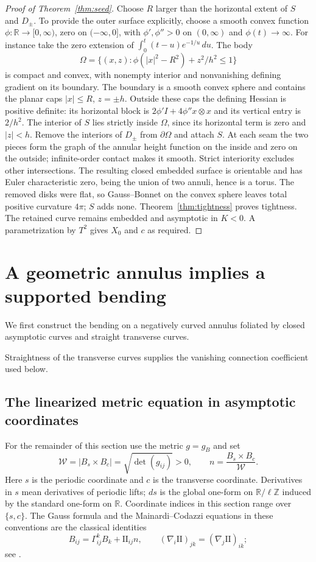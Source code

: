 \documentclass[11pt]{amsart}
\theoremstyle{definition}
\newcommand{\R}{\mathbb R}
\begin{document}
\begin{proof}[Proof of Theorem~\ref{thm:seed}]
Choose $R$ larger than the horizontal extent of $S$ and $D_\pm$.
To provide the outer surface explicitly, choose a smooth convex
function $\phi:\R\to[0,\infty)$, zero on $(-\infty,0]$, with
$\phi',\phi''>0$ on $(0,\infty)$ and $\phi(t)\to\infty$.
For instance take the zero extension of
$\int_0^t(t-u)e^{-1/u}\,du$. The body
\[
 \Omega=\{(x,z):\phi(|x|^2-R^2)+z^2/h^2\le1\}
\]
is compact and convex, with nonempty interior and nonvanishing
defining gradient on its boundary. The boundary is a smooth
convex sphere and contains the planar caps $|x|\le R$, $z=\pm h$.
Outside these caps the defining Hessian is positive definite:
its horizontal block is $2\phi'I+4\phi''x\otimes x$ and its
vertical entry is $2/h^2$. The interior of $S$ lies strictly
inside $\Omega$, since its horizontal term is zero and $|z|<h$.
Remove the interiors of $D_\pm$ from $\partial\Omega$ and
attach $S$. At each seam the two pieces form the graph of the
annular height function on the inside and zero on the outside;
infinite-order contact makes it smooth. Strict interiority excludes
other intersections. The resulting closed embedded surface is
orientable and has Euler characteristic zero, being the union of
two annuli, hence is a torus. The removed disks were flat,
so Gauss--Bonnet on the convex sphere leaves total positive curvature
$4\pi$; $S$ adds none. Theorem~\ref{thm:tightness} proves tightness.
The retained curve remains embedded and asymptotic in $K<0$.
A parametrization by $T^2$ gives $X_0$ and $c$ as required.
\end{proof}

\section{A geometric annulus implies a supported bending}
\label{sec:bending}

We first construct the bending on a negatively curved annulus
foliated by closed asymptotic curves and straight transverse curves.


Straightness of the transverse curves supplies the vanishing
connection coefficient used below.

\subsection{The linearized metric equation in asymptotic coordinates}

For the remainder of this section use the metric $g=g_B$ and set
\[
 \mathcal W=|B_s\times B_c|=\sqrt{\det(g_{ij})}>0,\qquad
 n=\frac{B_s\times B_c}{\mathcal W}.
\]
Here $s$ is the periodic coordinate and $c$ is the transverse coordinate.
Derivatives in $s$ mean derivatives of periodic lifts; $ds$ is the
global one-form on $\R/\ell\mathbb Z$ induced by the standard one-form
on $\R$. Coordinate indices in this section range over $\{s,c\}$.
The Gauss formula and the Mainardi--Codazzi equations in these
conventions are the classical identities
\[
 B_{ij}=\Gamma^k_{ij}B_k+\mathrm{II}_{ij}n,\qquad
 (\nabla_i\mathrm{II})_{jk}=(\nabla_j\mathrm{II})_{ik};
\]
see \cite[\S4-3]{doCarmo}.
\end{document}

